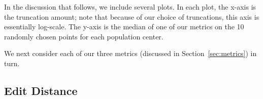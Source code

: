 \documentclass[10pt, conference, compsocconf]{IEEEtran}
\newcommand{\cdiff}{\delta}
\begin{document}
{In the discussion that follows, we include several plots. In each
plot, the x-axis is the truncation amount; note that because of our
choice of truncations, this axis is essentially log-scale.  The y-axis
is the median of one of our metrics on the 10 randomly chosen points
for each population center.







We next consider each of our three metrics (discussed in Section~\ref{sec:metrics})
in turn.

\subsection{Edit Distance}

\begin{figure}
  \centering

  \begin{subfigure}{\textwidth}
  \begin{tabular}{ccc}
    

\end{tabular}
\end{subfigure}
\end{figure}}
\end{document}
